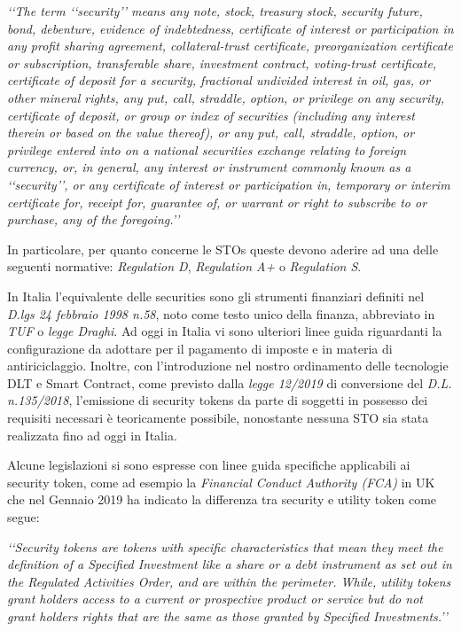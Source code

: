 \textit{‘‘The term ‘‘security’’ means any note, stock, treasury stock, security future, bond, debenture, evidence of indebtedness, certificate of interest or participation in any profit sharing agreement, collateral-trust certificate, preorganization certificate or subscription, transferable share, investment contract, voting-trust certificate, certificate of deposit for a security, fractional undivided interest in oil, gas, or other mineral rights, any put, call, straddle, option, or privilege on any security, certificate of deposit, or group or index of securities (including any interest therein or based on the value thereof), or any put, call, straddle, option, or privilege entered into on a national securities exchange relating to foreign currency, or, in general, any interest or instrument commonly known as a ‘‘security’’, or any certificate of interest or participation in, temporary or interim certificate for, receipt for, guarantee of, or warrant or right to subscribe to or purchase, any of the foregoing.’’}

In particolare, per quanto concerne le STOs queste devono aderire ad una delle seguenti normative: \textit{Regulation D}, \textit{Regulation A+} o \textit{Regulation S}\cite{K31,K32,K33}. 

In Italia l'equivalente delle securities sono gli strumenti finanziari definiti nel \textit{D.lgs 24 febbraio 1998 n.58}, noto come testo unico della finanza, abbreviato in \textit{TUF} o \textit{legge Draghi}\cite{K34}. Ad oggi in Italia vi sono ulteriori linee guida riguardanti la configurazione da adottare per il pagamento di imposte e in materia di antiriciclaggio. Inoltre, con l'introduzione nel nostro ordinamento delle tecnologie DLT e Smart Contract, come previsto dalla \textit{legge 12/2019} di conversione del \textit{D.L. n.135/2018}, l'emissione di security tokens da parte di soggetti in possesso dei requisiti necessari è teoricamente possibile, nonostante nessuna STO sia stata realizzata fino ad oggi in Italia.

Alcune legislazioni si sono espresse con linee guida specifiche applicabili ai security token, come ad esempio la \textit{Financial Conduct Authority (FCA)} in UK che nel Gennaio 2019 ha indicato la differenza tra security e utility token come segue:

\textit{‘‘Security tokens are tokens with specific characteristics that mean they meet the definition of a Specified Investment like a share or a debt instrument as set out in the Regulated Activities Order, and are within the perimeter.
While, utility tokens grant holders access to a current or prospective product or service but do not grant holders rights that are the same as those granted by Specified Investments.’’}

